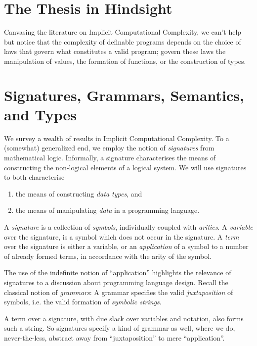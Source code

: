 \section{The Thesis in Hindsight}

Canvasing the literature on Implicit Computational Complexity, we can't help
but notice that the complexity of definable programs depends on the choice of
laws that govern what constitutes a valid program; govern these laws the
manipulation of values, the formation of functions, or the construction of
types.

\section{Signatures, Grammars, Semantics, and Types}

We survey a wealth of results in Implicit Computational Complexity.  To a
(somewhat) generalized end, we employ the notion of \emph{signatures} from
mathematical logic. Informally, a signature characterises the means of
constructing the non-logical elements of a logical system. We will use
signatures to both characterise

\begin{enumerate}[label=(\arabic*)]

\item the means of constructing \emph{data types}, and

\item the means of manipulating \emph{data} in a programming language.

\end{enumerate}

A \emph{signature} is a collection of \emph{symbols}, individually coupled with
\emph{arities}. A \emph{variable} over the signature, is a symbol which does
not occur in the signature. A \emph{term} over the signature is either a
variable, or an \emph{application} of a symbol to a number of already formed
terms, in accordance with the arity of the symbol.

The use of the indefinite notion of ``application'' highlights the relevance of
signatures to a discussion about programming language design. Recall the
classical notion of \emph{grammars}: A grammar specifies the valid
\emph{juxtaposition} of symbols, i.e. the valid formation of \emph{symbolic
strings}.

A term over a signature, with due slack over variables and notation, also forms
such a string. So signatures specify a kind of grammar as well, where we do,
never-the-less, abstract away from ``juxtaposition'' to mere ``application''.

